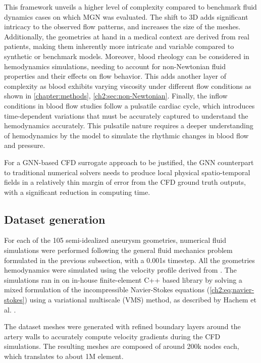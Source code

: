 This framework unveils a higher level of complexity compared to benchmark fluid dynamics cases on which MGN was evaluated. The shift to 3D adds significant intricacy to the observed flow patterns, and increases the size of the meshes. Additionally, the geometries at hand in a medical context are derived from real patients, making them inherently more intricate and variable compared to synthetic or benchmark models. Moreover, blood rheology can be considered in hemodynamics simulations, needing to account for non-Newtonian fluid properties and their effects on flow behavior. This adds another layer of complexity as blood exhibits varying viscosity under different flow conditions as shown in \autoref{chapter:methods}, \autoref{ch2:sec:non-Newtonian}. Finally, the inflow conditions in blood flow studies follow a pulsatile cardiac cycle, which introduces time-dependent variations that must be accurately captured to understand the hemodynamics accurately. This pulsatile nature requires a deeper understanding of hemodynamics by the model to simulate the rhythmic changes in blood flow and pressure.

For a GNN-based CFD surrogate approach to be justified, the GNN counterpart to traditional numerical solvers needs to produce local physical spatio-temporal fields in a relatively thin margin of error from the CFD ground truth outputs, with a significant reduction in computing time.


\subsection{Dataset generation}\label{ch3:sec:dataset_details}

For each of the 105 semi-idealized aneurysm geometries, numerical fluid simulations were performed following the general fluid mechanics problem formulated in the previous subsection, with a 0.001s timestep. All the geometries hemodynamics were simulated using the velocity profile derived from \cite{ford_characterization_2005}. The simulations ran in on in-house finite-element C++ based library by solving a mixed formulation of the incompressible Navier-Stokes equations (\autoref{ch2:eq:navier-stokes}) using a variational multiscale (VMS) method, as described by Hachem et al. \cite{hachem_stabilized_2010}.

The dataset meshes were generated with refined boundary layers around the artery walls to accurately compute velocity gradients during the CFD simulations. The resulting meshes are composed of around 200k nodes each, which translates to about 1M element.

